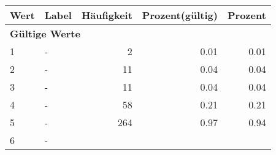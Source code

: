      \begin{longtable}{lXrrr}
     \toprule
     \textbf{Wert} & \textbf{Label} & \textbf{Häufigkeit} & \textbf{Prozent(gültig)} & \textbf{Prozent} \\
     \endhead
     \midrule
     \multicolumn{5}{l}{\textbf{Gültige Werte}}\\

     1 &
     \multicolumn{1}{X}{ -  } &


       \num{2} &
       \num[round-mode=places,round-precision=2]{0,01} &
         \num[round-mode=places,round-precision=2]{0,01} \\

     2 &
     \multicolumn{1}{X}{ -  } &


       \num{11} &
       \num[round-mode=places,round-precision=2]{0,04} &
         \num[round-mode=places,round-precision=2]{0,04} \\

     3 &
     \multicolumn{1}{X}{ -  } &


       \num{11} &
       \num[round-mode=places,round-precision=2]{0,04} &
         \num[round-mode=places,round-precision=2]{0,04} \\

     4 &
     \multicolumn{1}{X}{ -  } &


       \num{58} &
       \num[round-mode=places,round-precision=2]{0,21} &
         \num[round-mode=places,round-precision=2]{0,21} \\

     5 &
     \multicolumn{1}{X}{ -  } &


       \num{264} &
       \num[round-mode=places,round-precision=2]{0,97} &
         \num[round-mode=places,round-precision=2]{0,94} \\

     6 &
     \multicolumn{1}{X}{ -  } &



\end{longtable}
